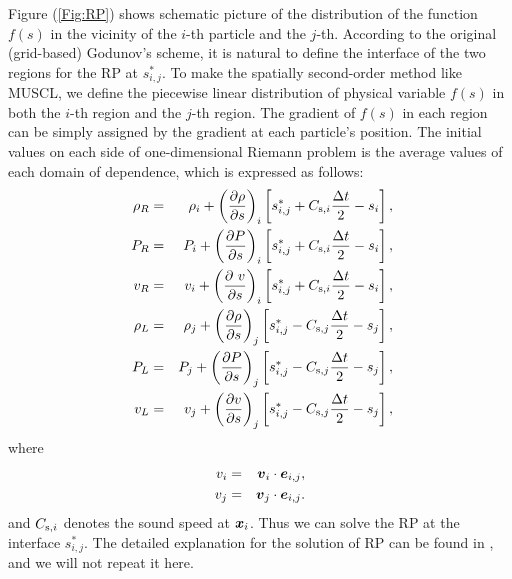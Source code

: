 \documentclass{cjour}
\newcommand{ \Vec   }[1]{ \mbox{\boldmath $ #1 $} }
\newcommand{ \PD    }[2]{ \frac{ \partial #1 }{ \partial #2 } }
\begin{document}
\begin{article}
Figure (\ref{Fig:RP}) shows 
schematic picture of the distribution of the function $f(s)$ 
in the vicinity of the $i$-th particle and the $j$-th. 
According to the original (grid-based) Godunov's scheme, it is natural 
to define the interface of the two regions for the RP at $s^*_{i,j}$. 
To make the spatially second-order method like MUSCL, 
we define the piecewise linear distribution of physical variable 
$f(s)$ in both the $i$-th region and the $j$-th region. 
The gradient of $f(s)$ in each region can be simply assigned by 
the gradient at each particle's position. 
The initial values on each side of one-dimensional Riemann 
problem is the average values of each domain of dependence,  
which is expressed as follows: 
\begin{eqnarray}
       \rho_R & = &  \rho_i 
                  +  \left( \PD{\rho}{s} \right)_{i}
                     \left[ 
                      s^*_{i,j} + C_{{\rm s},i} \frac{\Delta t}{2} - s_i
                     \right],
                                                      \nonumber \\
       \  P_R & = &     P_i 
                  +  \left( \PD{   P}{s} \right)_{i}
                     \left[ 
                      s^*_{i,j} + C_{{\rm s},i} \frac{\Delta t}{2} - s_i
                     \right],
                                                      \nonumber \\
       \  v_R & = &     v_i 
                  +  \left( \PD{\  v}{s} \right)_{i}
                     \left[ 
                      s^*_{i,j} + C_{{\rm s},i} \frac{\Delta t}{2} - s_i
                     \right],
                                                      \nonumber \\
       \rho_L & = &  \rho_j 
                  +  \left( \PD{\rho}{s} \right)_{j}
                     \left[ 
                      s^*_{i,j} - C_{{\rm s},j} \frac{\Delta t}{2} - s_j
                     \right],
                                                      \nonumber \\
       \  P_L & = &     P_j 
                  +  \left( \PD{   P}{s} \right)_{j}
                     \left[ 
                      s^*_{i,j} - C_{{\rm s},j} \frac{\Delta t}{2} - s_j
                     \right],
                                                      \nonumber \\
       \  v_L & = &     v_j 
                  +  \left( \PD{   v}{s} \right)_{j}
                     \left[ 
                      s^*_{i,j} - C_{{\rm s},j} \frac{\Delta t}{2} - s_j
                     \right],
\end{eqnarray}
where 
\begin{eqnarray}
                  v_i & = & \Vec{v}_i \cdot \Vec{e}_{i,j} ,  
                                                      \nonumber \\
                  v_j & = & \Vec{v}_j \cdot \Vec{e}_{i,j} . 
\end{eqnarray}
and $C_{{\rm s},i}$ denotes the sound speed at $\Vec{x}_i$.
Thus we can solve the RP at the interface $s^*_{i,j}$. 
The detailed explanation for the solution of RP can be found in 
\cite{vL:1979,CW:PPM}, and we will not repeat it here. 


\end{article}
\end{document}
